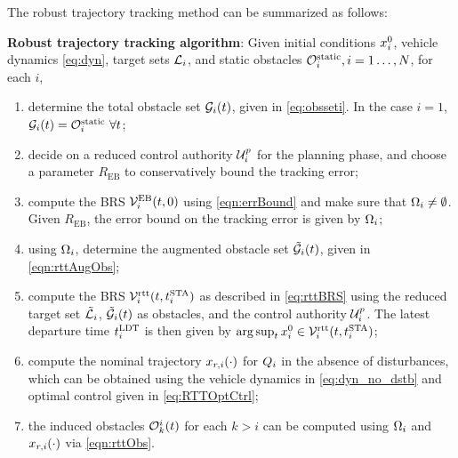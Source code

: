 The robust trajectory tracking method can be summarized as follows:
\begin{alg}
\label{alg:rtt}
\textbf{Robust trajectory tracking algorithm}: Given initial conditions $x_i^0$, vehicle dynamics \eqref{eq:dyn}, target sets $\mathcal{L}_i$, and static obstacles $\mathcal{O}^\text{static}_i, i = 1\ldots, N$, for each $i$,
\begin{enumerate}[leftmargin = 0.5cm]
\item determine the total obstacle set $\mathcal{G}_i(t)$, given in \eqref{eq:obsseti}. In the case $i=1$, $\mathcal{G}_i(t) = \mathcal{O}^\text{static}_i ~ \forall t$;
\item decide on a reduced control authority $\mathcal{U}^p_i$ for the planning phase, and choose a parameter $R_{\text{EB}}$ to conservatively bound the tracking error;
\item compute the BRS $\mathcal{V}^{\text{EB}}_{i}(t, 0)$ using \eqref{eqn:errBound} and make sure that $\Omega_i \neq \emptyset$. Given $R_{\text{EB}}$, the error bound on the tracking error is given by $\Omega_i$;
\item using $\Omega_i$, determine the augmented obstacle set $\tilde{\mathcal{G}}_i(t)$, given in \eqref{eqn:rttAugObs};
\item compute the BRS $\mathcal{V}_i^\text{rtt}(t, t^\text{STA}_i)$ as described in \eqref{eq:rttBRS} using the reduced target set $\tilde{\mathcal{L}}_i$, $\tilde{\mathcal{G}}_i(t)$ as obstacles, and the control authority $\mathcal{U}^p_i$. The latest departure time $t^\text{LDT}_i$ is then given by $\arg \sup_t x^0_i \in \mathcal{V}_i^\text{rtt}(t, t^\text{STA}_i)$;
\item compute the nominal trajectory $x_{r,i}(\cdot)$ for $Q_i$ in the absence of disturbances, which can be obtained using the vehicle dynamics in \eqref{eq:dyn_no_dstb} and optimal control given in \eqref{eq:RTTOptCtrl};
\item the induced obstacles $\mathcal{O}_k^i(t)$ for each $k>i$ can be computed using $\Omega_i$ and $x_{r,i}(\cdot)$ via \eqref{eqn:rttObs}.
\end{enumerate}
\end{alg}